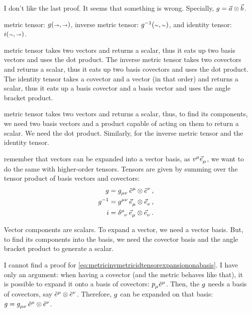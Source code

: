  I don't like the last proof. It seems that something is wrong. Specially, $g = \vec a\otimes\vec b$.

 metric tensor: $\metric\vat{\vslot,\vslot}$, inverse metric tensor: $\invmet\vat{\cslot,\cslot}$, and identity tensor: $\idtens\vat{\cslot,\vslot}$.

 metric tensor takes two vectors and returns a scalar, thus it eats up two basis vectors and uses the dot product. The inverse metric tensor takes two covectors and returns a scalar, thus it eats up two basis covectors and uses the dot product. The identity tensor takes a covector and a vector (in that order) and returns a scalar, thus it eats up a basis covector and a basis vector and uses the angle bracket product.

 metric tensor takes two vectors and returns a scalar, thus, to find its components, we need two basis vectors and a product capable of acting on them to return a scalar. We need the dot product. Similarly, for the inverse metric tensor and the identity tensor.

 remember that vectors can be expanded into a vector basis, as $\tvec v\mu\tbvec\mu$, we want to do the same with higher-order tensors. Tensors are given by summing over the tensor product of basis vectors and covectors:
%
\begin{align}\label{eq:metricinvmetricidtensorexpansiononabasis}
  \metric &= \tmetric\mu\nu\,\tbcov\mu\tprod\tbcov\nu \,,\\\nonumber
  \invmet &= \tinvmet\mu\nu\,\tbvec\mu\tprod\tbvec\nu \,,\\\nonumber
  \idtens &= \tkron\mu\nu  \,\tbvec\mu\tprod\tbvec\nu   \,.\nonumber
\end{align}

 Vector components are scalars. To expand a vector, we need a vector basis. But, to find its components into the basis, we need the covector basis and the angle bracket product to generate a scalar.

 I cannot find a proof for \cref{eq:metricinvmetricidtensorexpansiononabasis}. I have only an argument: when having a covector (and the metric behaves like that), it is possible to expand it onto a basis of covectors: $\tcov p\mu\tbcov\mu$. Then, the $g$ needs a basis of covectors, say $\tbcov\mu\tprod\tbcov\nu$. Therefore, $g$ can be expanded on that basis: $\metric = \tmetric\mu\nu\,\tbcov\mu\tprod\tbcov\nu$.

